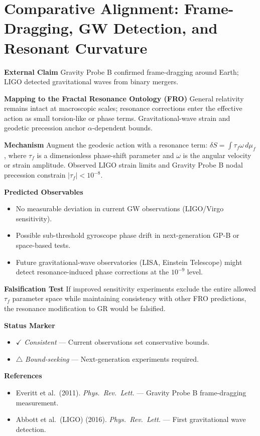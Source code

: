 \section{Comparative Alignment: Frame-Dragging, GW Detection, and Resonant Curvature}

\textbf{External Claim}
Gravity Probe B confirmed frame-dragging around Earth; LIGO detected gravitational waves from binary mergers.

\textbf{Mapping to the Fractal Resonance Ontology (FRO)}
General relativity remains intact at macroscopic scales; resonance corrections enter the effective action as small torsion-like or phase terms. Gravitational-wave strain and geodetic precession anchor $\alpha$-dependent bounds.

\textbf{Mechanism}
Augment the geodesic action with a resonance term: $\delta S = \int \tau_f \omega \, d\mu_f$, where $\tau_f$ is a dimensionless phase-shift parameter and $\omega$ is the angular velocity or strain amplitude. Observed LIGO strain limits and Gravity Probe B nodal precession constrain $|\tau_f| < 10^{-8}$.

\textbf{Predicted Observables}
\begin{itemize}
\item No measurable deviation in current GW observations (LIGO/Virgo sensitivity).
\item Possible sub-threshold gyroscope phase drift in next-generation GP-B or space-based tests.
\item Future gravitational-wave observatories (LISA, Einstein Telescope) might detect resonance-induced phase corrections at the $10^{-9}$ level.
\end{itemize}

\textbf{Falsification Test}
If improved sensitivity experiments exclude the entire allowed $\tau_f$ parameter space while maintaining consistency with other FRO predictions, the resonance modification to GR would be falsified.

\textbf{Status Marker}
\begin{itemize}
\item $\checkmark$ \textit{Consistent} — Current observations set conservative bounds.
\item $\triangle$ \textit{Bound-seeking} — Next-generation experiments required.
\end{itemize}

\textbf{References}
\begin{itemize}
\item Everitt et al.\ (2011). \textit{Phys.\ Rev.\ Lett.} — Gravity Probe B frame-dragging measurement\cite{everitt2011}.
\item Abbott et al.\ (LIGO) (2016). \textit{Phys.\ Rev.\ Lett.} — First gravitational wave detection\cite{abbott2016gw}.
\end{itemize}


